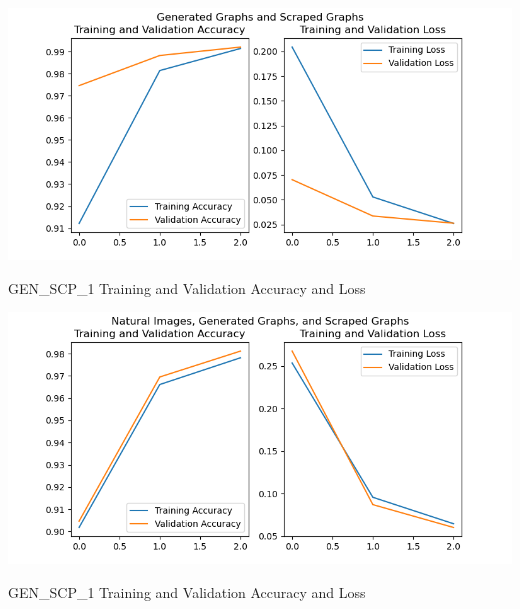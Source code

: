 \documentclass[12pt]{article}
\begin{document}
            \begin{table}
            
                \begin{center}

                    \includegraphics[scale=0.8]{GEN_SCP_1_HIST_RESULTS.png}
                    \caption{GEN\_SCP\_1 Training and Validation Accuracy and Loss}
                    \label{gen-scp-acc-loss}
        
                \end{center}
                
        
            
                \begin{center}

                    \includegraphics[scale=0.8]{CIFAR_GEN_SCP_1_HIST_RESULTS.png}
                    \caption{GEN\_SCP\_1 Training and Validation Accuracy and Loss}
                    \label{cifar-gen-scp-acc-loss}
        
                \end{center}
                
            \end{table}
\end{document}
